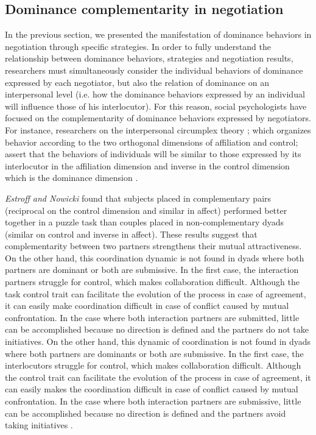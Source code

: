 \documentclass{llncs}
\begin{document}
	\subsection{Dominance complementarity in negotiation}
	In the previous section, we presented the manifestation of dominance behaviors in negotiation through specific strategies.
	In order to fully understand the relationship between dominance behaviors, strategies and negotiation results, researchers must simultaneously consider the individual behaviors of dominance expressed by each negotiator, but also the relation of dominance on an interpersonal level (i.e. how the dominance behaviors expressed by an individual will influence those of his interlocutor).	For this reason, social psychologists have focused on the complementarity of dominance behaviors expressed by negotiators. For instance, researchers on the interpersonal circumplex theory \cite{wiggins1979psychological,kiesler19831982}; which organizes behavior according to the two orthogonal dimensions of affiliation and control; assert that the behaviors of individuals will be similar to those expressed by its interlocutor in the affiliation dimension and inverse in the control dimension which is the dominance dimension \cite{tiedens2003power}.
	
	\emph{Estroff and Nowicki} \cite{estroff1992interpersonal} found that subjects placed in complementary pairs (reciprocal on the control dimension and similar in affect) performed better together in a puzzle task than couples placed in non-complementary dyads (similar on control and inverse in affect). These results suggest that complementarity between two partners strengthens their mutual attractiveness.
	On the other hand, this coordination dynamic is not found in dyads where both partners are dominant or both are submissive. 
	In the first case, the interaction partners struggle for control, which makes collaboration difficult. Although the task control trait can facilitate the evolution of the process in case of agreement, it can easily make coordination difficult in case of conflict caused by mutual confrontation. In the case where both interaction partners are submitted, little can be accomplished because no direction is defined and the partners do not take initiatives.
	On the other hand, this dynamic of coordination  is not found in dyads where both partners are dominants or both are submissive. 
	In the first case, the interlocutors struggle for control, which makes collaboration difficult. Although the control trait can facilitate the evolution of the process in case of agreement, it can easily makes the coordination difficult in case of conflict caused by mutual confrontation. In the case where both interaction partners are submissive, little can be accomplished because no direction is defined and the partners avoid taking initiatives \cite{wiltermuth2015benefits}.
	
\end{document}
